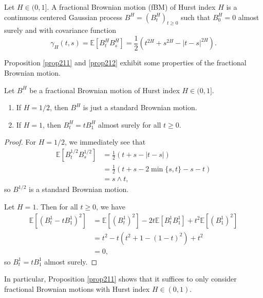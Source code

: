 \begin{defn}
    Let $H\in (0,1]$. A fractional Brownian motion (fBM) of Hurst index $H$ is a continuous centered Gaussian process $B^{H}=(B_{t}^{H})_{t\geq 0}$ such that $B_{0}^{H}=0$ almost surely and with covariance function
    \begin{equation}
        \gamma_{H}(t,s)=\mathbb{E}[B_{t}^{H}B_{s}^{H}]=\frac{1}{2}\left(t^{2H}+s^{2H}-|t-s|^{2H}\right).
    \end{equation}
\end{defn}
Proposition \ref{prop211} and \ref{prop212} exhibit some properties of the fractional Brownian motion.
\begin{prop}\label{prop211}
    Let $B^{H}$ be a fractional Brownian motion of Hurst index $H\in (0,1]$.
    \begin{enumerate}
        \item If $H=1/2$, then $B^{H}$ is just a standard Brownian motion.
        \item If $H=1$, then $B^{H}_{t}=tB_{1}^{H}$ almost surely for all $t\geq 0$.
    \end{enumerate}
\end{prop}
\begin{proof}
    For $H=1/2$, we immediately see that
    \begin{align}
        \mathbb{E}[B_{t}^{1/2}B_{s}^{1/2}]&=\frac{1}{2}\left(t+s-|t-s|\right)\\
        &= \frac{1}{2}\left(t+s-2 \min\{s,t\}-s-t\right)\\
        &= s\land t,
    \end{align}
    so $B^{1/2}$ is a standard Brownian motion.

    Let $H=1$. Then for all $t\geq 0$, we have
    \begin{align}
        \mathbb{E}\left[(B^{1}_{t}-tB_{1}^{1})^{2}\right]&= \mathbb{E}\left[(B_{t}^{1})^{2}\right]-2t\mathbb{E}\left[B_{t}^{1}B_{1}^{1}\right]+t^{2}\mathbb{E}\left[(B_{1}^{1})^{2}\right]\\
        &= t^{2}-t\left(t^{2}+1-(1-t)^{2}\right)+t^{2}\\
        &= 0,
    \end{align}
    so $B_{t}^{1}=tB_{1}^{1}$ almost surely.
\end{proof}
In particular, Proposition \ref{prop211} shows that it suffices to only consider fractional Brownian motions with Hurst index $H\in (0,1)$.
